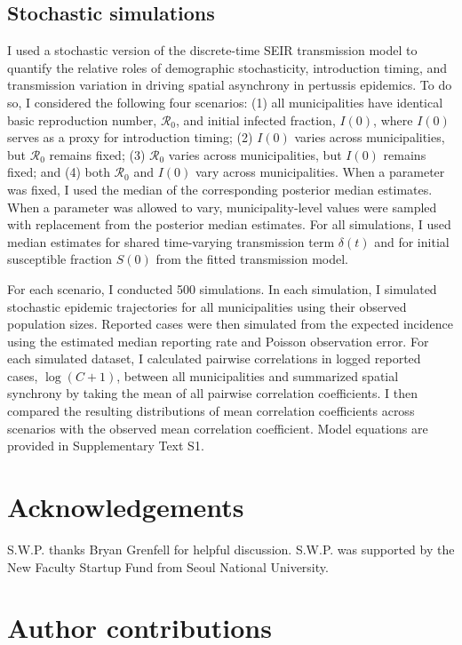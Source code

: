 \documentclass[12pt]{article}
\begin{document}
\subsection*{Stochastic simulations}

I used a stochastic version of the discrete-time SEIR transmission model to quantify the relative roles of demographic stochasticity, introduction timing, and transmission variation in driving spatial asynchrony in pertussis epidemics.
To do so, I considered the following four scenarios:
(1) all municipalities have identical basic reproduction number, $\mathcal R_0$, and initial infected fraction, $I(0)$, where $I(0)$ serves as a proxy for introduction timing;
(2) $I(0)$ varies across municipalities, but $\mathcal R_0$ remains fixed;
(3) $\mathcal R_0$ varies across municipalities, but $I(0)$ remains fixed;
and (4) both $\mathcal R_0$ and $I(0)$ vary across municipalities.
When a parameter was fixed, I used the median of the corresponding posterior median estimates.
When a parameter was allowed to vary, municipality-level values were sampled with replacement from the posterior median estimates.
For all simulations, I used median estimates for shared time-varying transmission term $\delta(t)$ and for initial susceptible fraction $S(0)$ from the fitted transmission model.

For each scenario, I conducted 500 simulations.
In each simulation, I simulated stochastic epidemic trajectories for all municipalities using their observed population sizes.
Reported cases were then simulated from the expected incidence using the estimated median reporting rate and Poisson observation error.
For each simulated dataset, I calculated pairwise correlations in logged reported cases, $\log(C+1)$, between all municipalities and summarized spatial synchrony by taking the mean of all pairwise correlation coefficients.
I then compared the resulting distributions of mean correlation coefficients across scenarios with the observed mean correlation coefficient.
Model equations are provided in Supplementary Text S1.

\section*{Acknowledgements}

S.W.P. thanks Bryan Grenfell for helpful discussion.
S.W.P. was supported by the New Faculty Startup Fund from Seoul National University.

\section*{Author contributions}
\end{document}
